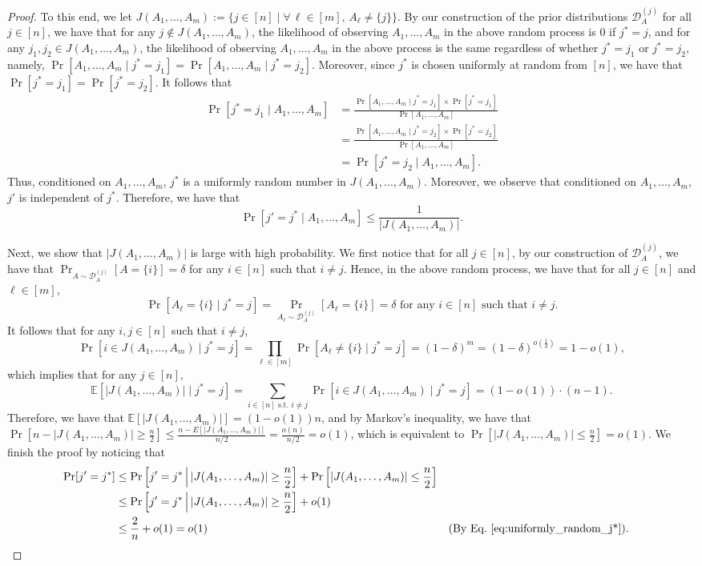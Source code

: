 \documentclass[11pt]{article}
\newcommand{\D}{\mathcal D}
\def \E {\mathbb{E}}
\begin{document}
\begin{proof}
To this end, we let $J(A_1,\dots,A_m):=\{j\in[n] \mid \forall\,\ell\in[m],\,A_{\ell}\neq\{j\}\}$. By our construction of the prior distributions $\D_A^{(j)}$ for all $j\in[n]$, we have that for any $j\notin J(A_1,\dots,A_m)$, the likelihood of observing $A_1,\dots,A_m$ in the above random process is $0$ if $j^*=j$, and for any $j_1,j_2\in J(A_1,\dots,A_m)$, the likelihood of observing $A_1,\dots,A_m$ in the above process is the same regardless of whether $j^*=j_1$ or $j^*=j_2$, namely, $\Pr[A_1,\dots,A_m\mid j^*=j_1]=\Pr[A_1,\dots,A_m\mid j^*=j_2]$. Moreover, since $j^*$ is chosen uniformly at random from $[n]$, we have that $\Pr[j^*=j_1]=\Pr[j^*=j_2]$. It follows that
\begin{align*}
    \Pr[j^*=j_1 \mid A_1,\dots,A_m]&=\frac{\Pr[A_1,\dots,A_m\mid j^*=j_1]\times\Pr[j^*=j_1]}{\Pr[A_1,\dots,A_m]}\\
    &=\frac{\Pr[A_1,\dots,A_m\mid j^*=j_2]\times\Pr[j^*=j_2]}{\Pr[A_1,\dots,A_m]}\\
    &=\Pr[j^*=j_2 \mid A_1,\dots,A_m].
\end{align*}
Thus, conditioned on $A_1,\dots,A_m$, $j^*$ is a uniformly random number in $J(A_1,\dots,A_m)$. Moreover, we observe that conditioned on $A_1,\dots,A_m$, $j'$ is independent of $j^*$. Therefore, we have that
\begin{equation}\label{eq:uniformly_random_j*}
\Pr[j'=j^*\mid A_1,\dots,A_m]\le\frac{1}{|J(A_1,\dots,A_m)|}.
\end{equation}

Next, we show that $|J(A_1,\dots,A_m)|$ is large with high probability. We first notice that for all $j\in[n]$, by our construction of $\D_A^{(j)}$, we have that $\Pr_{A\sim\D_A^{(j)}}[A=\{i\}]=\delta$ for any $i\in[n]$ such that $i\neq j$. Hence, in the above random process, we have that for all $j\in[n]$ and $\ell\in[m]$,
\[
\Pr[A_{\ell}=\{i\}\mid j^*=j]=\Pr_{A_{\ell}\sim\D_A^{(j)}}[A_{\ell}=\{i\}]=\delta \textrm{ for any $i\in[n]$ such that $i\neq j$}.
\]
It follows that for any $i,j\in[n]$ such that $i\neq j$,
\[
    \Pr[i\in J(A_1,\dots,A_m)\mid j^*=j]=\prod_{\ell\in[m]}\Pr[A_{\ell}\neq\{i\}\mid j^*=j]=(1-\delta)^m=(1-\delta)^{o(\frac{1}{\delta})}=1-o(1),
\]
which implies that for any $j\in[n]$,
\[
\E[|J(A_1,\dots,A_m)|\mid j^*=j]=\sum_{i\in[n]\textrm{ s.t. } i\neq j}\Pr[i\in J(A_1,\dots,A_m)\mid j^*=j]=(1-o(1))\cdot(n-1).
\]
Therefore, we have that $\E[|J(A_1,\dots,A_m)|]=(1-o(1))n$, and by Markov's inequality, we have that $\Pr[n-|J(A_1,\dots,A_m)|\ge\frac{n}{2}]\le\frac{n-E[|J(A_1,\dots,A_m)|]}{n/2}=\frac{o(n)}{n/2}=o(1)$, which is equivalent to $\Pr[|J(A_1,\dots,A_m)|\le\frac{n}{2}]=o(1)$. We finish the proof by noticing that
\begin{align*}
\Pr[j'=j^*]&\le\Pr\left[j'=j^*\,\middle\vert\, |J(A_1,\dots,A_m)|\ge\frac{n}{2}\right]+\Pr\left[|J(A_1,\dots,A_m)|\le\frac{n}{2}\right]\\
&\le\Pr\left[j'=j^*\,\middle\vert\, |J(A_1,\dots,A_m)|\ge\frac{n}{2}\right]+o(1)\\
&\le\frac{2}{n}+o(1)=o(1) &&\text{(By Eq.~\eqref{eq:uniformly_random_j*})}.
\end{align*}
\end{proof}
\end{document}

